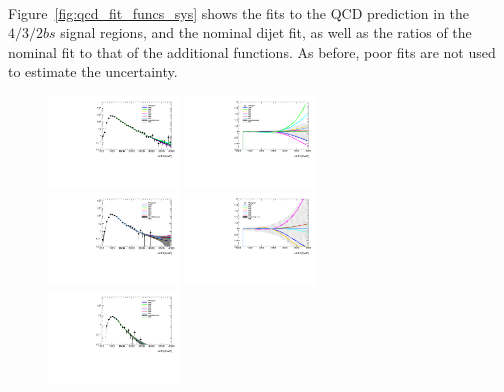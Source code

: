 \paragraph{}
Figure~\ref{fig:qcd_fit_funcs_sys} shows the fits to the QCD prediction in the $4/3/2bs$ signal regions, and the nominal dijet fit, as well as the ratios of the nominal fit to that of the additional functions.
As before, poor fits are not used to estimate the uncertainty.

\begin{figure}[htb!]
\begin{center}
\includegraphics[width=0.31\textwidth,angle=-90]{figures/boosted/Syst_Smooth/smoothFuncCompare_22_comp.pdf}
\includegraphics[width=0.31\textwidth,angle=-90]{figures/boosted/Syst_Smooth/smoothFuncCompare_22_comp_ratio.pdf} \\
\includegraphics[width=0.31\textwidth,angle=-90]{figures/boosted/Syst_Smooth/smoothFuncCompare_33_comp.pdf}
\includegraphics[width=0.31\textwidth,angle=-90]{figures/boosted/Syst_Smooth/smoothFuncCompare_33_comp_ratio.pdf} \\
\includegraphics[width=0.31\textwidth,angle=-90]{figures/boosted/Syst_Smooth/smoothFuncCompare_44_comp.pdf}

\end{center}
\end{figure}
